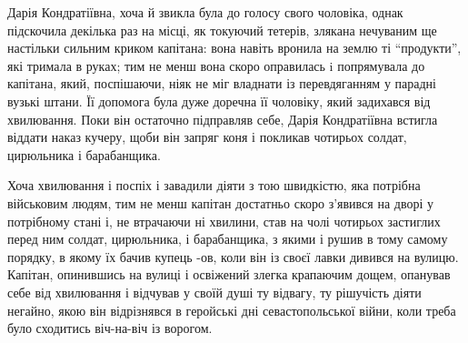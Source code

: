 \documentclass[a4paper,20pt]{report}
\begin{document}
Дарія Кондратіївна, хоча й звикла була до голосу свого чоловіка, однак
підскочила декілька раз на місці, як токуючий тетерів, злякана нечуваним ще
настільки сильним криком капітана: вона навіть вронила на землю ті
``продукти'', які тримала в руках; тим не менш вона скоро оправилась i
попрямувала до капітана, який, поспішаючи, ніяк не міг владнати із
перевдяганням у парадні вузькі штани. Її допомога була дуже доречна її
чоловіку, який задихався від хвилювання. Поки він остаточно підправляв себе,
Дарія Кондратіївна встигла віддати наказ кучеру, щоби він запряг коня і
покликав чотирьох солдат, цирюльника і барабанщика.

Хоча хвилювання і поспіх і завадили діяти з тою швидкістю, яка 
потрібна військовим людям, тим не менш
капітан достатньо скоро з'явився на дворі у потрібному стані і, не втрачаючи ні
хвилини, став на чолі чотирьох застиглих перед ним солдат, цирюльника, і
барабанщика, з якими і рушив в тому самому порядку, в якому їх бачив купець
-ов, коли він із своєї лавки дивився на вулицю. Капітан, опинившись на вулиці і
освіжений злегка крапаючим дощем, опанував себе від хвилювання і відчував у
своїй душі ту відвагу, ту рішучість діяти негайно, якою він відрізнявся в
геройські дні севастопольської війни, коли треба було сходитись віч-на-віч із
ворогом.


    



\end{document}
